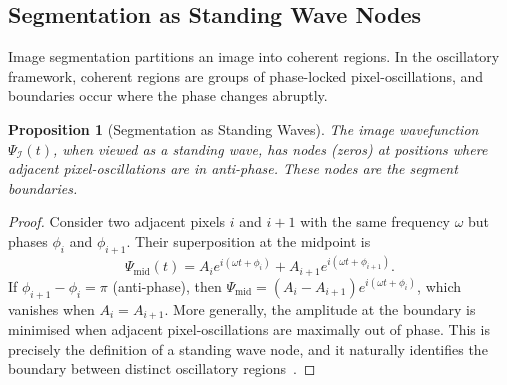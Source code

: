 \documentclass[11pt,twocolumn,a4paper]{article}
\newtheorem{proposition}[theorem]{Proposition}
\begin{document}
\subsection{Segmentation as Standing Wave Nodes}

Image segmentation partitions an image into coherent regions. In the oscillatory framework, coherent regions are groups of phase-locked pixel-oscillations, and boundaries occur where the phase changes abruptly.

\begin{proposition}[Segmentation as Standing Waves]\label{prop:segmentation}
The image wavefunction $\Psi_{\mathcal{I}}(t)$, when viewed as a standing wave, has nodes (zeros) at positions where adjacent pixel-oscillations are in anti-phase. These nodes are the segment boundaries.
\end{proposition}

\begin{proof}
Consider two adjacent pixels $i$ and $i+1$ with the same frequency $\omega$ but phases $\phi_i$ and $\phi_{i+1}$. Their superposition at the midpoint is
\begin{equation}
    \Psi_{\text{mid}}(t) = A_i e^{i(\omega t + \phi_i)} + A_{i+1} e^{i(\omega t + \phi_{i+1})}.
\end{equation}
If $\phi_{i+1} - \phi_i = \pi$ (anti-phase), then $\Psi_{\text{mid}} = (A_i - A_{i+1})e^{i(\omega t + \phi_i)}$, which vanishes when $A_i = A_{i+1}$. More generally, the amplitude at the boundary is minimised when adjacent pixel-oscillations are maximally out of phase. This is precisely the definition of a standing wave node, and it naturally identifies the boundary between distinct oscillatory regions~\citep{rayleigh1902, helmholtz1863}.
\end{proof}
\end{document}
